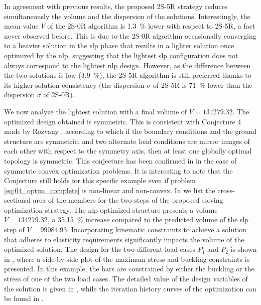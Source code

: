 In agreement with previous results, the proposed 2S-5R strategy reduces simultaneously the volume and the dispersion of the solutions. Interestingly, the mean value $\overline{V}$ of the 2S-0R algorithm is \qty{1.3}{\%} lower with respect to 2S-5R, a fact never observed before. This is due to the 2S-0R algorithm occasionally converging to a heavier solution in the \gls{slp} phase that results in a lighter solution once optimized by the \gls{nlp}, suggesting that the lightest \gls{slp} configuration does not always correspond to the lightest \gls{nlp} design. However, as the difference between the two solutions is low (\qty{3.9}{\%}), the 2S-5R algorithm is still preferred thanks to its higher solution consistency (the dispersion $\sigma$ of 2S-5R is \qty{71}{\%} lower than the dispersion $\sigma$ of 2S-0R).

We now analyze the lightest solution with a final volume of $V=134279.32$. The optimized design obtained is symmetric. This is consistent with Conjecture 4 made by Rozvany , according to which if the boundary conditions and the ground structure are symmetric, and two alternate load conditions are mirror images of each other with respect to the symmetry axis, then at least one globally optimal topology is symmetric. This conjecture has been confirmed in  in the case of symmetric convex optimization problems. It is interesting to note that the Conjecture still holds for this specific example even if problem \ref{eq:04_optim_complete} is non-linear and non-convex. In  we list the cross-sectional area of the members for the two steps of the proposed solving optimization strategy. The \gls{nlp} optimized structure presents a volume $V=134279.32$, a \qty{35.15}{\%} increase compared to the predicted volume of the \gls{slp} step of $V=99084.93$. Incorporating kinematic constraints to achieve a solution that adheres to elasticity requirements significantly impacts the volume of the optimized solution. The design for the two different load cases $P_1$ and $P_2$ is shown in , where a side-by-side plot of the maximum stress and buckling constraints is presented. In this example, the bars are constrained by either the buckling or the stress of one of the two load cases. The detailed value of the design variables of the solution is given in , while the iteration history curves of the optimization can be found in .

